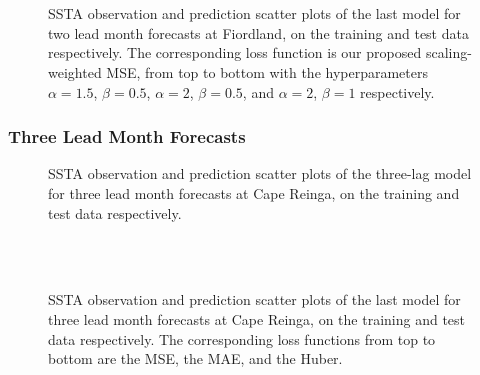 \documentclass[11pt, a4paper]{article}
\begin{document}
\begin{figure}[H]
\centering
{}
\\
\\
\caption{SSTA observation and prediction scatter plots of the last model for two lead month forecasts at Fiordland, on the training and test data respectively. The corresponding loss function is our proposed scaling-weighted MSE, from top to bottom with the hyperparameters $\alpha=1.5$, $\beta=0.5$, $\alpha=2$, $\beta=0.5$, and $\alpha=2$, $\beta=1$ respectively.}
\end{figure}

\subsubsection{Three Lead Month Forecasts}

\begin{figure}[H]
\centering
{}
\caption{SSTA observation and prediction scatter plots of the three-lag model for three lead month forecasts at Cape Reinga, on the training and test data respectively.}
\end{figure}

\begin{figure}[H]
\centering
{}
\\
\\
\caption{SSTA observation and prediction scatter plots of the last model for three lead month forecasts at Cape Reinga, on the training and test data respectively. The corresponding loss functions from top to bottom are the MSE, the MAE, and the Huber.}
\end{figure}
\end{document}
